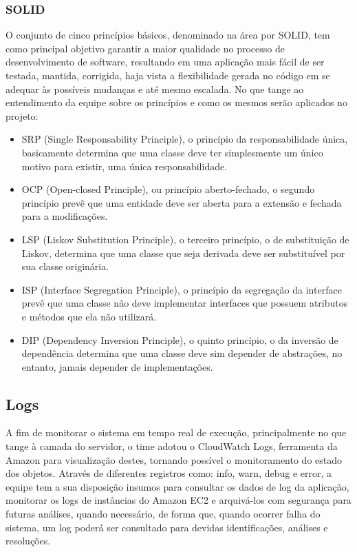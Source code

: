 \documentclass[
    12pt,               %
    openright,          %
    oneside,
    a4paper,            %
    BIBLATEX,           %
    TODO,               %
    english,            %
    brazil              %
    ]{ifsp-spo-inf-ctds}
\begin{document}
    \subsubsection{SOLID}
    O conjunto de cinco princípios básicos, denominado na área por SOLID, tem como principal objetivo garantir a maior qualidade no processo de desenvolvimento de software, resultando em uma aplicação mais fácil de ser testada, mantida, corrigida, haja vista a flexibilidade gerada no código em se adequar às possíveis mudanças e até mesmo escalada. No que tange ao entendimento da equipe sobre os princípios e como os mesmos serão aplicados no projeto:

    \begin{itemize}
        \item 
        SRP (Single Responsability Principle), o princípio da responsabilidade única, basicamente determina que uma classe deve ter simplesmente um único motivo para existir, uma única responsabilidade.
        \item 
        OCP (Open-closed Principle), ou princípio aberto-fechado, o segundo princípio prevê que uma entidade deve ser aberta para a extensão e fechada para a modificações.
        \item 
        LSP (Liskov Substitution Principle), o terceiro
        princípio, o de substituição de Liskov, determina que uma classe que seja derivada deve ser substituível por sua classe originária.
        \item 
        ISP (Interface Segregation Principle), o princípio da segregação da interface prevê que uma classe não deve implementar interfaces que possuem atributos e métodos que ela não utilizará.
        \item 
        DIP (Dependency Inversion Principle), o quinto princípio, o da inversão de dependência determina que uma classe deve sim depender de abstrações, no entanto, jamais depender de implementações.
    \end{itemize}

        \subsection{Logs}
        A fim de monitorar o sistema em tempo real de execução, principalmente no que tange à camada do servidor, o time adotou o CloudWatch Logs, ferramenta da Amazon para visualização destes, tornando possível o monitoramento do estado dos objetos. Através de diferentes registros como: info, warn, debug e error, a equipe tem a sua disposição insumos para consultar os dados de log da aplicação, monitorar os logs de instâncias do Amazon EC2 e arquivá-los com segurança para futuras análises, quando necessário, de forma que, quando ocorrer falha do sistema, um log poderá ser consultado para devidas identificações, análises e resoluções.
\end{document}
